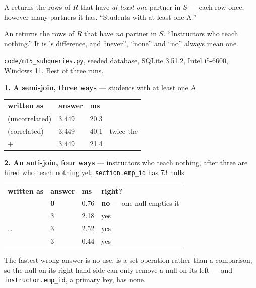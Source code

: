\begin{definitionbox}
A  returns the rows of $R$ that have \emph{at least one}
partner in $S$ --- each row once, however many partners it has. ``Students with
at least one A.''

\smallskip
An  returns the rows of $R$ that have \emph{no} partner in
$S$. ``Instructors who teach nothing.'' It is 's difference,
and ``never'', ``none'' and ``no'' always mean one.
\end{definitionbox}

\begin{measured}
\textsf{\footnotesize \texttt{code/m15\_subqueries.py}, seeded database,
SQLite 3.51.2, Intel i5-6600, Windows 11. Best of three runs.}

\medskip
\textbf{1. A semi-join, three ways} --- students with at least one A

\begin{tabular}{@{}L{5.0cm}R{2.0cm}R{1.9cm}L{5.0cm}@{}}
\textbf{written as} & \textbf{answer} & \textbf{ms} & \\
 (uncorrelated)   & 3{,}449 & 20.3 & \\
 (correlated) & 3{,}449 & 40.1 & twice the  \\
 +  & 3{,}449 & 21.4 & \\
\end{tabular}

\medskip
\textbf{2. An anti-join, four ways} --- instructors who teach nothing, after
three are hired who teach nothing yet; \texttt{section.emp\_id} has 73 nulls

\begin{tabular}{@{}L{5.0cm}R{2.0cm}R{1.9cm}L{5.0cm}@{}}
\textbf{written as} & \textbf{answer} & \textbf{ms} & \textbf{right?} \\
                 & \textbf{0} & 0.76 & \textbf{no} --- one null empties it \\
             & 3 & 2.18 & yes \\
 \dots\  & 3 & 2.52 & yes \\
                 & 3 & 0.44 & yes \\
\end{tabular}

\smallskip
The fastest wrong answer is no use.  is a set operation rather
than a comparison, so the null on its right-hand side can only remove a null
on its left --- and \texttt{instructor.emp\_id}, a primary key, has none.


\end{measured}
